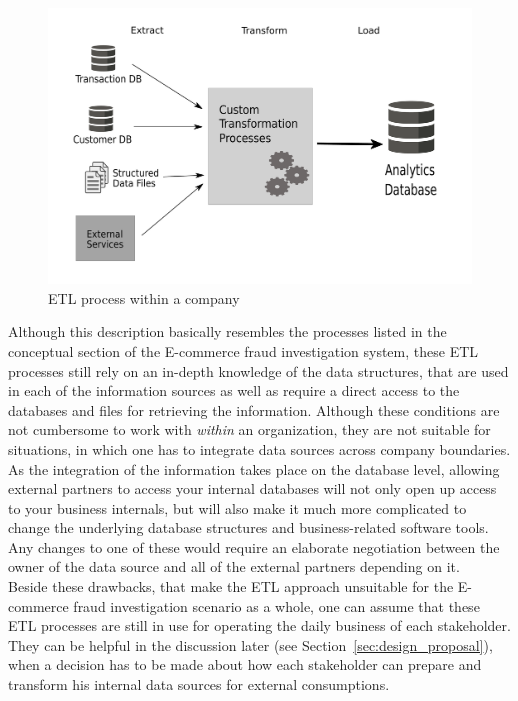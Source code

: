 \begin{figure}[!ht]
  \centering
  \includegraphics[width=0.9\columnwidth]{images/etl_process.pdf}
  \caption[ETL process within a company]{\gls{ETL} process within a company \citep[pg. 165]{wood2014linked}}
\label{fig:images_etl_process}
\end{figure}

Although this description basically resembles the processes listed in the conceptual section of the \gls{E-commerce} fraud investigation system, these \gls{ETL} processes still rely on an in-depth knowledge of the data structures, that are used in each of the information sources as well as require a direct access to the databases and files for retrieving the information. Although these conditions are not cumbersome to work with \emph{within} an organization, they are not suitable for situations, in which one has to integrate data sources across company boundaries. As the integration of the information takes place on the database level, allowing external partners to access your internal databases will not only open up access to your business internals, but will also make it much more complicated to change the underlying database structures and business-related software tools. Any changes to one of these would require an elaborate negotiation between the owner of the data source and all of the external partners depending on it. \\

Beside these drawbacks, that make the \gls{ETL} approach unsuitable for the \gls{E-commerce} fraud investigation scenario as a whole, one can assume that these \gls{ETL} processes are still in use for operating the daily business of each stakeholder. They can be helpful in the discussion later (see Section~\ref{sec:design_proposal}), when a decision has to be made about how each stakeholder can prepare and transform his internal data sources for external consumptions.

